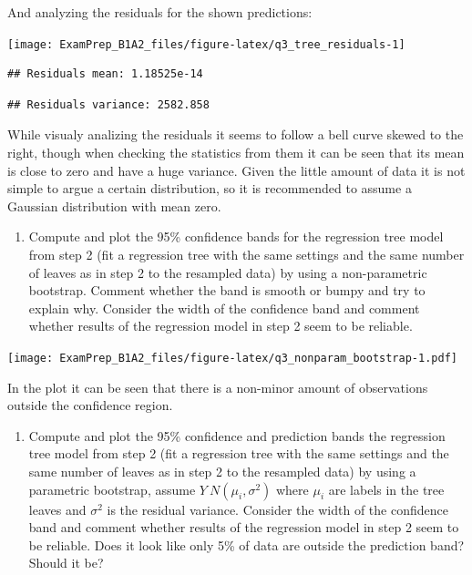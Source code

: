 \documentclass[
]{article}
\providecommand{\tightlist}{%
  \setlength{\itemsep}{0pt}\setlength{\parskip}{0pt}}
\begin{document}
And analyzing the residuals for the shown predictions:

\begin{center}\texttt{[image: ExamPrep\_B1A2\_files/figure-latex/q3\_tree\_residuals-1]} \end{center}

\begin{verbatim}
## Residuals mean: 1.18525e-14
\end{verbatim}

\begin{verbatim}
## Residuals variance: 2582.858
\end{verbatim}

While visualy analizing the residuals it seems to follow a bell curve
skewed to the right, though when checking the statistics from them it
can be seen that its mean is close to zero and have a huge variance.
Given the little amount of data it is not simple to argue a certain
distribution, so it is recommended to assume a Gaussian distribution
with mean zero.

\begin{enumerate}
\def\labelenumi{\arabic{enumi}.}
\setcounter{enumi}{2}
\tightlist
\item
  Compute and plot the 95\% confidence bands for the regression tree
  model from step 2 (fit a regression tree with the same settings and
  the same number of leaves as in step 2 to the resampled data) by using
  a non-parametric bootstrap. Comment whether the band is smooth or
  bumpy and try to explain why. Consider the width of the confidence
  band and comment whether results of the regression model in step 2
  seem to be reliable.
\end{enumerate}

\texttt{[image: ExamPrep\_B1A2\_files/figure-latex/q3\_nonparam\_bootstrap-1.pdf]}

In the plot it can be seen that there is a non-minor amount of
observations outside the confidence region.

\begin{enumerate}
\def\labelenumi{\arabic{enumi}.}
\setcounter{enumi}{3}
\tightlist
\item
  Compute and plot the 95\% confidence and prediction bands the
  regression tree model from step 2 (fit a regression tree with the same
  settings and the same number of leaves as in step 2 to the resampled
  data) by using a parametric bootstrap, assume
  \(Y ~ N(\mu_i, \sigma^2)\) where \(\mu_i\) are labels in the tree
  leaves and \(\sigma^2\) is the residual variance. Consider the width
  of the confidence band and comment whether results of the regression
  model in step 2 seem to be reliable. Does it look like only 5\% of
  data are outside the prediction band? Should it be?
\end{enumerate}
\end{document}
